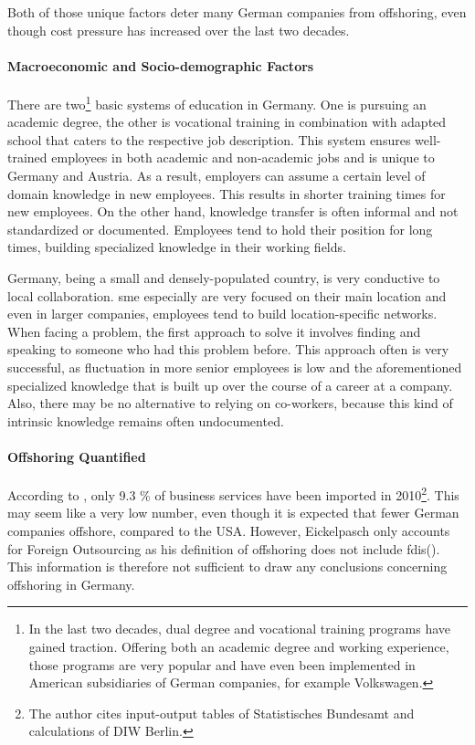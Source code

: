 Both of those unique factors deter many German companies from offshoring, even though cost pressure has increased over the last two decades.

\paragraph{Macroeconomic and Socio-demographic Factors}
There are two\footnote{In the last two decades, dual degree and vocational training programs have gained traction. Offering both an academic degree and working experience, those programs are very popular and have even been implemented in American subsidiaries of German companies, for example Volkswagen.} basic systems of education in Germany. One is pursuing an academic degree, the other is vocational training in combination with adapted school that caters to the respective job description. This system ensures well-trained employees in both academic and non-academic jobs and is unique to Germany and Austria. As a result, employers can assume a certain level of domain knowledge in new employees. This results in shorter training times for new employees. On the other hand, knowledge transfer is often informal and not standardized or documented. Employees tend to hold their position for long times, building specialized knowledge in their working fields. 

Germany, being a small and densely-populated country, is very conductive to local collaboration. \Gls{sme} especially are very focused on their main location and even in larger companies, employees tend to build location-specific networks. When facing a problem, the first approach to solve it involves finding and speaking to someone who had this problem before. This approach often is very successful, as fluctuation in more senior employees is low and the aforementioned specialized knowledge that is built up over the course of a career at a company. Also, there may be no alternative to relying on co-workers, because this kind of intrinsic knowledge remains often undocumented.


\paragraph{Offshoring Quantified}
According to \cite[p. 70]{Eickelpasch.2015}, only 9.3 \% of business services have been imported in 2010\footnote{The author cites input-output tables of  Statistisches Bundesamt and calculations of DIW Berlin.}. This may seem like a very low number, even though it is expected that fewer German companies offshore, compared to the USA. However, Eickelpasch only accounts for Foreign Outsourcing as his definition of offshoring does not include \glspl{fdi}(\cite[p. 56]{Eickelpasch.2015}). This information is therefore not sufficient to draw any conclusions concerning offshoring in Germany.

